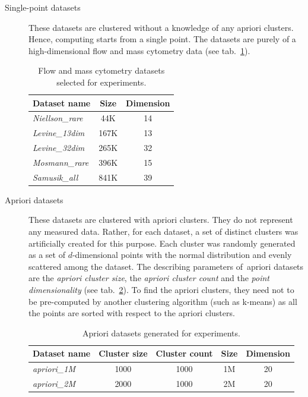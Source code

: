 \begin{description}
	\item[Single-point datasets] These datasets are clustered without a knowledge of any apriori clusters. Hence, computing starts from a single point. The datasets are purely of a high-dimensional flow and mass cytometry data \cite{flowrepo} (see tab.~\ref{tab04:single}).
	
	\begin{table}
		\centering
		\begin{tabular}{lcc}
			\toprule
			\textbf{Dataset name} & \textbf{Size} & \textbf{Dimension} \\ \midrule
			\emph{Niellson\_rare} &      44K      &         14         \\
			\emph{Levine\_13dim}  &     167K      &         13         \\
			\emph{Levine\_32dim}  &     265K      &         32         \\
			\emph{Mosmann\_rare}  &     396K      &         15         \\
			\emph{Samusik\_all}   &     841K      &         39         \\ \bottomrule
		\end{tabular}
	\caption{Flow and mass cytometry datasets selected for experiments.}
	\label{tab04:single}
	\end{table}

	\item[Apriori datasets] These datasets are clustered with apriori clusters. They do not represent any measured data. Rather, for each dataset, a set of distinct clusters was artificially created for this purpose. Each cluster was randomly generated as a set of $d$-dimensional points with the normal distribution and evenly scattered among the dataset. The describing parameters of~apriori datasets are the \emph{apriori cluster size}, the \emph{apriori cluster count} and the \emph{point dimensionality} (see tab.~\ref{tab04:apriori}). To find the apriori clusters, they need not to be pre-computed by another clustering algorithm (such as k-means) as all the points are sorted with respect to the apriori clusters.
	
	\begin{table}
		\centering
		\begin{tabular}{lcccc}
			\toprule
			\textbf{Dataset name} & \textbf{Cluster size} & \textbf{Cluster count} & \textbf{Size} & \textbf{Dimension} \\ \midrule
			\emph{apriori\_1M}    &         1000          &          1000          &      1M       &         20         \\
			\emph{apriori\_2M}    &         2000          &          1000          &      2M       &         20         \\ \bottomrule
		\end{tabular}
		\caption{Apriori datasets generated for experiments.}
		\label{tab04:apriori}
	\end{table}
	
\end{description}

